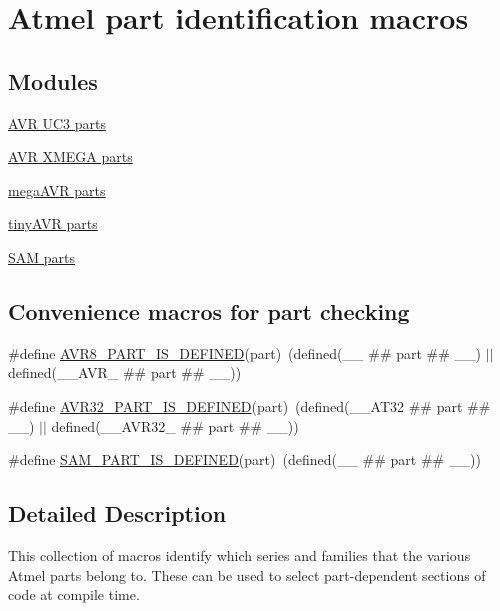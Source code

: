 \hypertarget{group__part__macros__group}{\section{Atmel part identification macros}
\label{group__part__macros__group}
}
\subsection*{Modules}
\begin{DoxyCompactItemize}
\item 
\hyperlink{group__uc3__part__macros__group}{A\-V\-R U\-C3 parts}
\item 
\hyperlink{group__xmega__part__macros__group}{A\-V\-R X\-M\-E\-G\-A parts}
\item 
\hyperlink{group__mega__part__macros__group}{mega\-A\-V\-R parts}
\item 
\hyperlink{group__tiny__part__macros__group}{tiny\-A\-V\-R parts}
\item 
\hyperlink{group__sam__part__macros__group}{S\-A\-M parts}
\end{DoxyCompactItemize}
\subsection*{Convenience macros for part checking}
\begin{DoxyCompactItemize}
\item 
\#define \hyperlink{group__part__macros__group_ga2fb54ec8ba6d98af5ed21dfb4ec97483}{A\-V\-R8\-\_\-\-P\-A\-R\-T\-\_\-\-I\-S\-\_\-\-D\-E\-F\-I\-N\-E\-D}(part)~(defined(\-\_\-\-\_\- \#\# part \#\# \-\_\-\-\_\-) $|$$|$ defined(\-\_\-\-\_\-\-A\-V\-R\-\_\- \#\# part \#\# \-\_\-\-\_\-))
\item 
\#define \hyperlink{group__part__macros__group_gac253d1a424ff2bc355184e3cdb93514d}{A\-V\-R32\-\_\-\-P\-A\-R\-T\-\_\-\-I\-S\-\_\-\-D\-E\-F\-I\-N\-E\-D}(part)~(defined(\-\_\-\-\_\-\-A\-T32 \#\# part \#\# \-\_\-\-\_\-) $|$$|$ defined(\-\_\-\-\_\-\-A\-V\-R32\-\_\- \#\# part \#\# \-\_\-\-\_\-))
\item 
\#define \hyperlink{group__part__macros__group_ga50580478fd56bb842e0cbdd354a6933c}{S\-A\-M\-\_\-\-P\-A\-R\-T\-\_\-\-I\-S\-\_\-\-D\-E\-F\-I\-N\-E\-D}(part)~(defined(\-\_\-\-\_\- \#\# part \#\# \-\_\-\-\_\-))
\end{DoxyCompactItemize}


\subsection{Detailed Description}
This collection of macros identify which series and families that the various Atmel parts belong to. These can be used to select part-\/dependent sections of code at compile time. 

